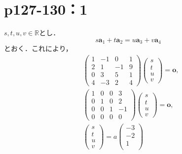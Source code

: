 \documentclass[a4paper,10pt,fleqn]{ltjsarticle}
\begin{document}
\section*{p127-130：1}

\begin{tleftbar}
    $s,t,u,v \in \mathbb{R}$とし．
    \[
        s\bm{a}_1+t\bm{a}_2=u\bm{a}_3+v\bm{a}_4
    \]
    とおく．これにより，
    \begin{align*}
         &
        \begin{pmatrix}
            1 & -1 & 0  & 1 \\
            2 & 1  & -1 & 9 \\
            0 & 3  & 5  & 1 \\
            4 & -3 & 2  & 4
        \end{pmatrix}
        \begin{pmatrix}
            s \\
            t \\
            u \\
            v
        \end{pmatrix}
        =\bm{o} , \\
         &
        \begin{pmatrix}
            1 & 0 & 0 & 3  \\
            0 & 1 & 0 & 2  \\
            0 & 0 & 1 & -1 \\
            0 & 0 & 0 & 0
        \end{pmatrix}
        \begin{pmatrix}
            s \\
            t \\
            u \\
            v
        \end{pmatrix}
        =\bm{o} , \\
         &
        \begin{pmatrix}
            s \\
            t \\
            u \\
            v
        \end{pmatrix}
        =a
        \begin{pmatrix}
            -3 \\
            -2 \\
            1  \\

\end{pmatrix}
\end{align*}
\end{tleftbar}
\end{document}
